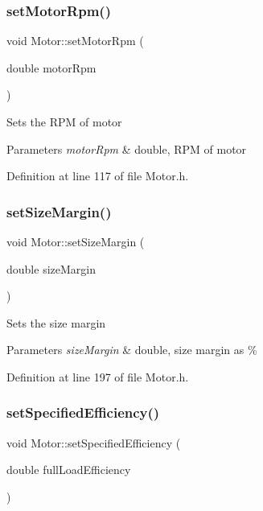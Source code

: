 \subsubsection{\texorpdfstring{set\+Motor\+Rpm()}{setMotorRpm()}}
{\footnotesize\ttfamily void Motor\+::set\+Motor\+Rpm (\begin{DoxyParamCaption}\item[{double}]{motor\+Rpm }\end{DoxyParamCaption})\hspace{0.3cm}{\ttfamily [inline]}}

Sets the R\+PM of motor 
\begin{DoxyParams}{Parameters}
{\em motor\+Rpm} & double, R\+PM of motor \\
\hline
\end{DoxyParams}


Definition at line 117 of file Motor.\+h.

\mbox{\label{class_motor_ab39a9375d17af151b6f9516674f37928}} 
\subsubsection{\texorpdfstring{set\+Size\+Margin()}{setSizeMargin()}}
{\footnotesize\ttfamily void Motor\+::set\+Size\+Margin (\begin{DoxyParamCaption}\item[{double}]{size\+Margin }\end{DoxyParamCaption})\hspace{0.3cm}{\ttfamily [inline]}}

Sets the size margin 
\begin{DoxyParams}{Parameters}
{\em size\+Margin} & double, size margin as \% \\
\hline
\end{DoxyParams}


Definition at line 197 of file Motor.\+h.

\mbox{\label{class_motor_a0a096ec5fc2b7e8ee40b4e7b30e5f337}} 
\subsubsection{\texorpdfstring{set\+Specified\+Efficiency()}{setSpecifiedEfficiency()}}
{\footnotesize\ttfamily void Motor\+::set\+Specified\+Efficiency (\begin{DoxyParamCaption}\item[{double}]{full\+Load\+Efficiency }\end{DoxyParamCaption})\hspace{0.3cm}{\ttfamily [inline]}}

